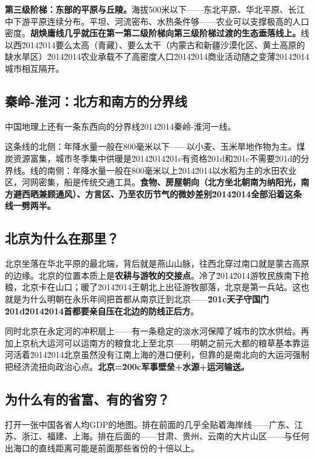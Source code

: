 \documentclass[a4paper,12pt]{ctexart}
\begin{document}
\textbf{第三级阶梯：东部的平原与丘陵。}海拔500米以下——东北平原、华北平原、长江中下游平原连续分布。平坦、河流密布、水热条件够——农业可以支撑极高的人口密度。\textbf{胡焕庸线几乎就压在第一第二级阶梯向第三级阶梯过渡的生态垂落线上。}线以西\u2014\u2014要么太高（青藏）、要么太干（内蒙古和新疆沙漠化区、黄土高原的缺水旱区）\u2014\u2014农业承载不了高密度人口\u2014\u2014商业活动随之变薄\u2014\u2014城市相互隔开。

\subsection*{秦岭-淮河：北方和南方的分界线}

中国地理上还有一条东西向的分界线\u2014\u2014秦岭-淮河一线。

这条线的北侧：年降水量一般在800毫米以下——以小麦、玉米旱地作物为主。煤炭资源富集，城市冬季集中供暖是\u2014\u2014\u201c有资格\u201d和\u201c不需要\u201d的分界线。线的南侧：年降水量一般在800毫米以上\u2014\u2014以水稻为主的水田农业区，河网密集，船是传统交通工具。\textbf{食物、房屋朝向（北方坐北朝南为纳阳光，南方避西晒兼顾通风）、方言区、乃至农历节气的微妙差别\u2014\u2014全部沿着这条线一劈两半。}

\subsection*{北京为什么在那里？}

北京坐落在华北平原的最北端，背后就是燕山山脉，往西北穿过南口就是蒙古高原的边缘。北京的位置本质上是\textbf{农耕与游牧的交接点}。冷了\u2014\u2014游牧民族南下抢粮，北京卡在山口；暖了\u2014\u2014王朝北上出征游牧部落，北京是第一兵站。这也就是为什么明朝在永乐年间把首都从南京迁到北京——\textbf{\u201c天子守国门\u201d\u2014\u2014首都要亲自压在北边的防线正后方}。

同时北京在永定河的冲积扇上——有一条稳定的淡水河保障了城市的饮水供给。再加上京杭大运河可以运南方的粮食北上至北京——明朝之前元大都的粮草基本靠运河活着\u2014\u2014北京虽然没有江南上海的港口便利，但靠的是南北向的大运河强制把经济流扭向政治心点。\textbf{北京=\u200c军事壁垒+水源+运河输送。}

\subsection*{为什么有的省富、有的省穷？}

打开一张中国各省人均GDP的地图。排在前面的几乎全贴着海岸线——广东、江苏、浙江、福建、上海。排在后面的——甘肃、贵州、云南的大片山区——与任何出海口的直线距离可能是前面那些省份的十倍以上。
\end{document}
